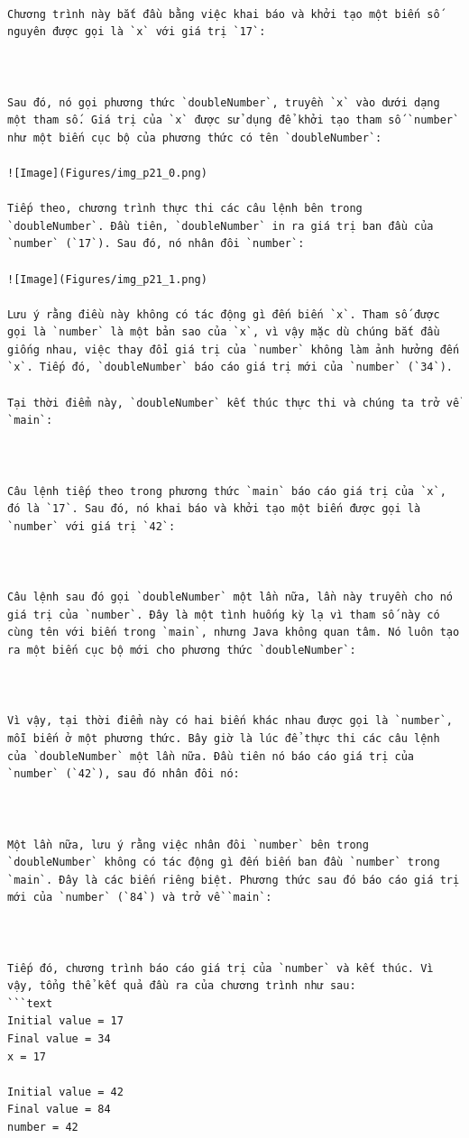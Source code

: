 \begin{verbatim}

Chương trình này bắt đầu bằng việc khai báo và khởi tạo một biến số nguyên được gọi là `x` với giá trị `17`:



Sau đó, nó gọi phương thức `doubleNumber`, truyền `x` vào dưới dạng một tham số. Giá trị của `x` được sử dụng để khởi tạo tham số `number` như một biến cục bộ của phương thức có tên `doubleNumber`:

![Image](Figures/img_p21_0.png)

Tiếp theo, chương trình thực thi các câu lệnh bên trong `doubleNumber`. Đầu tiên, `doubleNumber` in ra giá trị ban đầu của `number` (`17`). Sau đó, nó nhân đôi `number`:

![Image](Figures/img_p21_1.png)

Lưu ý rằng điều này không có tác động gì đến biến `x`. Tham số được gọi là `number` là một bản sao của `x`, vì vậy mặc dù chúng bắt đầu giống nhau, việc thay đổi giá trị của `number` không làm ảnh hưởng đến `x`. Tiếp đó, `doubleNumber` báo cáo giá trị mới của `number` (`34`).

Tại thời điểm này, `doubleNumber` kết thúc thực thi và chúng ta trở về `main`:



Câu lệnh tiếp theo trong phương thức `main` báo cáo giá trị của `x`, đó là `17`. Sau đó, nó khai báo và khởi tạo một biến được gọi là `number` với giá trị `42`:



Câu lệnh sau đó gọi `doubleNumber` một lần nữa, lần này truyền cho nó giá trị của `number`. Đây là một tình huống kỳ lạ vì tham số này có cùng tên với biến trong `main`, nhưng Java không quan tâm. Nó luôn tạo ra một biến cục bộ mới cho phương thức `doubleNumber`:



Vì vậy, tại thời điểm này có hai biến khác nhau được gọi là `number`, mỗi biến ở một phương thức. Bây giờ là lúc để thực thi các câu lệnh của `doubleNumber` một lần nữa. Đầu tiên nó báo cáo giá trị của `number` (`42`), sau đó nhân đôi nó:



Một lần nữa, lưu ý rằng việc nhân đôi `number` bên trong `doubleNumber` không có tác động gì đến biến ban đầu `number` trong `main`. Đây là các biến riêng biệt. Phương thức sau đó báo cáo giá trị mới của `number` (`84`) và trở về `main`:



Tiếp đó, chương trình báo cáo giá trị của `number` và kết thúc. Vì vậy, tổng thể kết quả đầu ra của chương trình như sau:
```text
Initial value = 17 
Final value = 34 
x = 17 
 
Initial value = 42 
Final value = 84 
number = 42
\end{verbatim}

